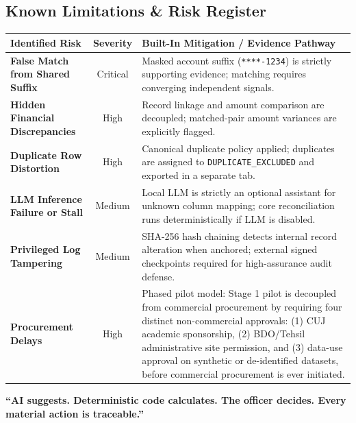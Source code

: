 \documentclass[11pt,a4paper]{article}
\newcommand{\code}[1]{\texttt{#1}}
\begin{document}
\subsection{Known Limitations \& Risk Register}
\vspace{0.15cm}
\noindent
\begin{tabularx}{\textwidth}{|l|c|Y|}
\hline
\textbf{Identified Risk} & \textbf{Severity} & \textbf{Built-In Mitigation / Evidence Pathway} \\
\hline
\textbf{False Match from Shared Suffix} & Critical & Masked account suffix (\code{****-1234}) is strictly supporting evidence; matching requires converging independent signals. \\
\hline
\textbf{Hidden Financial Discrepancies} & High & Record linkage and amount comparison are decoupled; matched-pair amount variances are explicitly flagged. \\
\hline
\textbf{Duplicate Row Distortion} & High & Canonical duplicate policy applied; duplicates are assigned to \code{DUPLICATE\_EXCLUDED} and exported in a separate tab. \\
\hline
\textbf{LLM Inference Failure or Stall} & Medium & Local LLM is strictly an optional assistant for unknown column mapping; core reconciliation runs deterministically if LLM is disabled. \\
\hline
\textbf{Privileged Log Tampering} & Medium & SHA-256 hash chaining detects internal record alteration when anchored; external signed checkpoints required for high-assurance audit defense. \\
\hline
\textbf{Procurement Delays} & High & Phased pilot model: Stage 1 pilot is decoupled from commercial procurement by requiring four distinct non-commercial approvals: (1) CUJ academic sponsorship, (2) BDO/Tehsil administrative site permission, and (3) data-use approval on synthetic or de-identified datasets, before commercial procurement is ever initiated. \\
\hline
\end{tabularx}

\vspace{0.3cm}
\begin{center}
    \textbf{“AI suggests. Deterministic code calculates. The officer decides. Every material action is traceable.”}
\end{center}
\end{document}
